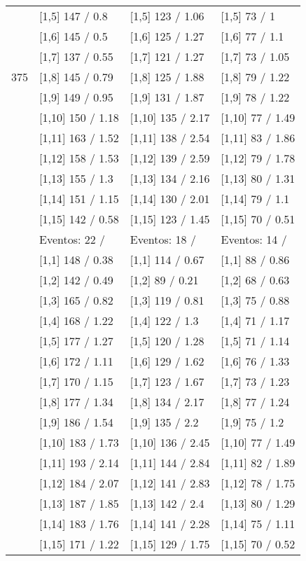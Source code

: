 \begin{table}
\begin{tabular}[t]{llll}
 & {}[1,5] 147  / 0.8 & {}[1,5] 123  / 1.06 & {}[1,5] 73  / 1\\
 & {}[1,6] 145  / 0.5 & {}[1,6] 125  / 1.27 & {}[1,6] 77  / 1.1\\
 & {}[1,7] 137  / 0.55 & {}[1,7] 121  / 1.27 & {}[1,7] 73  / 1.05\\
375 & {}[1,8] 145  / 0.79 & {}[1,8] 125  / 1.88 & {}[1,8] 79  / 1.22\\
\addlinespace
 & {}[1,9] 149  / 0.95 & {}[1,9] 131  / 1.87 & {}[1,9] 78  / 1.22\\
 & {}[1,10] 150  / 1.18 & {}[1,10] 135  / 2.17 & {}[1,10] 77  / 1.49\\
 & {}[1,11] 163  / 1.52 & {}[1,11] 138  / 2.54 & {}[1,11] 83  / 1.86\\
 & {}[1,12] 158  / 1.53 & {}[1,12] 139  / 2.59 & {}[1,12] 79  / 1.78\\
 & {}[1,13] 155  / 1.3 & {}[1,13] 134  / 2.16 & {}[1,13] 80  / 1.31\\
\addlinespace
 & {}[1,14] 151  / 1.15 & {}[1,14] 130  / 2.01 & {}[1,14] 79  / 1.1\\
 & {}[1,15] 142  / 0.58 & {}[1,15] 123  / 1.45 & {}[1,15] 70  / 0.51\\
 & Eventos:  22 / & Eventos:  18 / & Eventos:  14 /\\
 & {}[1,1] 148  / 0.38 & {}[1,1] 114  / 0.67 & {}[1,1] 88  / 0.86\\
 & {}[1,2] 142  / 0.49 & {}[1,2] 89  / 0.21 & {}[1,2] 68  / 0.63\\
\addlinespace
 & {}[1,3] 165  / 0.82 & {}[1,3] 119  / 0.81 & {}[1,3] 75  / 0.88\\
 & {}[1,4] 168  / 1.22 & {}[1,4] 122  / 1.3 & {}[1,4] 71  / 1.17\\
 & {}[1,5] 177  / 1.27 & {}[1,5] 120  / 1.28 & {}[1,5] 71  / 1.14\\
 & {}[1,6] 172  / 1.11 & {}[1,6] 129  / 1.62 & {}[1,6] 76  / 1.33\\
 & {}[1,7] 170  / 1.15 & {}[1,7] 123  / 1.67 & {}[1,7] 73  / 1.23\\
\addlinespace
500 & {}[1,8] 177  / 1.34 & {}[1,8] 134  / 2.17 & {}[1,8] 77  / 1.24\\
 & {}[1,9] 186  / 1.54 & {}[1,9] 135  / 2.2 & {}[1,9] 75  / 1.2\\
 & {}[1,10] 183  / 1.73 & {}[1,10] 136  / 2.45 & {}[1,10] 77  / 1.49\\
 & {}[1,11] 193  / 2.14 & {}[1,11] 144  / 2.84 & {}[1,11] 82  / 1.89\\
 & {}[1,12] 184  / 2.07 & {}[1,12] 141  / 2.83 & {}[1,12] 78  / 1.75\\
\addlinespace
 & {}[1,13] 187  / 1.85 & {}[1,13] 142  / 2.4 & {}[1,13] 80  / 1.29\\
 & {}[1,14] 183  / 1.76 & {}[1,14] 141  / 2.28 & {}[1,14] 75  / 1.11\\
 & {}[1,15] 171  / 1.22 & {}[1,15] 129  / 1.75 & {}[1,15] 70  / 0.52\\
\bottomrule
\end{tabular}
\end{table}
